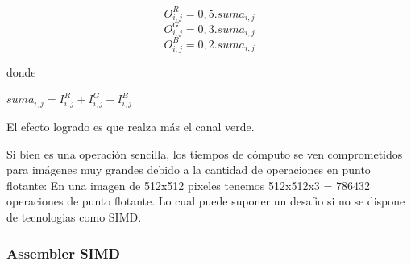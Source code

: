 \begin{center}
$$O_{i,j}^{R} = 0, 5 . suma_{i,j}$$
$$O_{i,j}^{G} = 0, 3 . suma_{i,j}$$
$$O_{i,j}^{B} = 0, 2 . suma_{i,j}$$
\end{center}

donde 

\begin{center}
$suma_{i,j} = I_{i,j}^{R} + I_{i,j}^{G} + I_{i,j}^{B}$
\end{center}

El efecto logrado es que realza más el canal verde. 

\newpage

\begin{figure}[h]
  \centering
  \hfill
\end{figure}

Si bien es una operación sencilla, los tiempos de cómputo se ven comprometidos para imágenes muy grandes debido a la cantidad de operaciones en punto flotante: En una imagen de 512x512 pixeles tenemos 512x512x3 = 786432 operaciones de punto flotante. Lo cual puede suponer un desafio si no se dispone de tecnologias como SIMD.

\subsubsection{Assembler SIMD}


